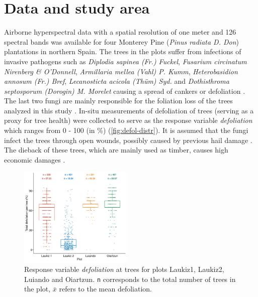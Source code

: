 \documentclass[letterpaper, peerreview, draftcls]{IEEEtran}
\begin{document}
\section{Data and study area}

Airborne hyperspectral data with a spatial resolution of one meter and 126 spectral bands was available for four Monterey Pine (\textit{Pinus radiata D. Don}) plantations in northern Spain.
The trees in the plots suffer from infections of invasive pathogens such as \textit{Diplodia sapinea (Fr.) Fuckel}, \textit{Fusarium circinatum Nirenberg \& O'Donnell}, \textit{Armillaria mellea (Vahl) P. Kumm}, \textit{Heterobasidion annosum (Fr.) Bref}, \textit{Lecanosticta acicola (Thüm) Syd.} and \textit{Dothisthroma septosporum (Dorogin) M. Morelet} causing a spread of cankers or defoliation \cite{mesanza2016, iturritxa2017}.
The last two fungi are mainly responsible for the foliation loss of the trees analyzed in this study \cite{iturritxa2014}.
In-situ measurements of defoliation of trees (serving as a proxy for tree health) were collected to serve as the response variable \textit{defoliation} which ranges from 0 - 100 (in \%) (\autoref{fig:defol-distr}).
It is assumed that the fungi infect the trees through open wounds, possibly caused by previous hail damage \cite{iturritxa2014}.
The dieback of these trees, which are mainly used as timber, causes high economic damages \cite{ganley2009}.

\begin{figure} [t!]
	\centering
	\begin{center}
		\includegraphics[width=0.48\textwidth] {defoliation-distribution-plot-1.pdf}
		\caption{Response variable \textit{defoliation} at trees for plots Laukiz1, Laukiz2, Luiando and Oiartzun. \texttt{n} corresponds to the total number of trees in the plot, $\bar{x}$ refers to the mean defoliation.}\label{fig:defol-distr}
	\end{center}
\end{figure}
\end{document}
